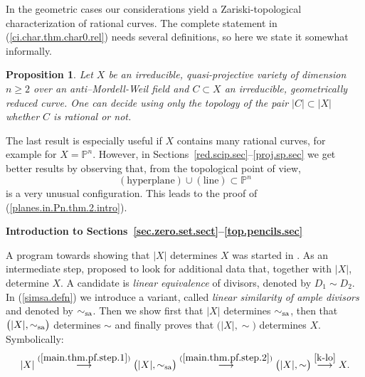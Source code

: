 \documentclass{amsart}
\newtheorem{prop}[thm]{Proposition}
\theoremstyle{definition}
\theoremstyle{remark}
\newcommand{\p}[0]{{\mathbb P}}
\newcommand{\simsa}[0]{\sim_{\rm sa}}
\begin{document}
In the geometric cases our considerations yield a Zariski-topological characterization of  rational curves.
The complete statement in (\ref{ci.char.thm.char0.rel}) needs several definitions, so here we state it somewhat informally. 


\begin{prop}  Let $X$ be an irreducible, quasi-projective variety of dimension $n\geq 2$ over an anti--Mordell-Weil   field  and
$C\subset X$ an irreducible, geometrically reduced curve. One can decide using only the topology of the pair
$|C|\subset |X|$ whether $C$ is rational  or not. 
\end{prop}


The last result is especially useful if $X$ contains many rational curves, for example for $X=\p^n$. However, in  Sections~\ref{red.scip.sec}--\ref{proj.sp.sec} 
we get better results by observing that,
from the topological point of view, 
$$
(\mbox{hyperplane})\cup (\mbox{line})\subset \p^n
$$
is a very unusual configuration. This leads to the proof of (\ref{planes.in.Pn.thm.2.intro}). 






\medskip
{\bf Introduction to Sections~\ref{sec.zero.set.sect}--\ref{top.pencils.sec}}
\medskip










A program towards showing that $|X|$ determines $X$ was started in \cite{k-lo}.  As an intermediate step,  \cite{k-lo} proposed to look for additional data that, together with $|X|$, determine $X$. A  candidate is {\it linear equivalence} of divisors, denoted by $D_1\sim D_2$.  
In (\ref{simsa.defn}) we introduce a variant, called
{\it linear  similarity of ample divisors} and denoted by $\simsa$.
Then we show first that  $|X|$ determines $\simsa$, then that
$\bigl( |X|, \simsa\bigr)$ determines $\sim$ and finally \cite{k-lo} proves that 
$\bigl( |X|, \sim\bigr) $ determines $X$. Symbolically:
$$
|X|\stackrel{(\mbox{\ref{main.thm.pf.step.1}})}{\longrightarrow}
\bigl( |X|, \simsa\bigr)
\stackrel{(\mbox{\ref{main.thm.pf.step.2}})}{\longrightarrow}
\bigl( |X|, \sim\bigr)
\stackrel{\mbox{\cite{k-lo}}}{\longrightarrow}
X.
$$



\end{document}
